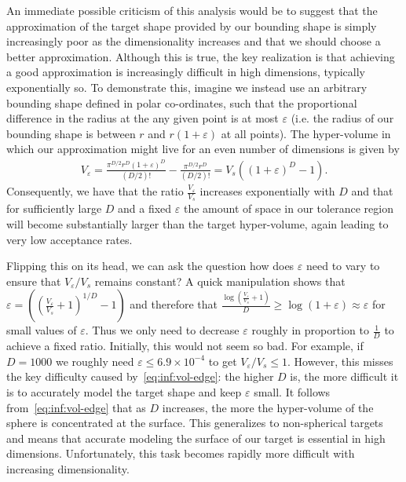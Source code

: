An immediate possible criticism of this analysis would be to suggest that the approximation of the
target shape provided by our bounding shape is simply increasingly poor as the dimensionality 
increases and that we should choose 
a better approximation.  Although this is true, the key realization is that achieving a good approximation
is increasingly difficult in high dimensions, typically exponentially so.
To demonstrate this, imagine we instead use an arbitrary bounding shape defined in polar
co-ordinates, such that the proportional difference in the radius at the any given point is at most $\varepsilon$
(i.e. the radius of our bounding shape is between $r$ and $r(1+\varepsilon)$ at all points).
The hyper-volume in which our approximation might live for an even number of dimensions
is given by
\begin{align}
\label{eq:inf:vol-edge}
V_{\varepsilon} = \frac{\pi^{D/2}r^D(1+\varepsilon)^D}{(D/2)!}-\frac{\pi^{D/2}r^D}{(D/2)!}
= V_s \left(\left(1+\varepsilon\right)^D-1\right).
\end{align}
Consequently, we have that the ratio $\frac{V_{\varepsilon}}{V_s}$ increases exponentially with $D$
and that for sufficiently large $D$ and a fixed $\varepsilon$ the amount of space in our tolerance
region will become substantially larger than the target hyper-volume, again leading to very low acceptance
rates.

Flipping this on its head, we can ask the question how does $\varepsilon$ need to vary
to ensure that $V_{\varepsilon}/V_s$ remains constant?  A quick manipulation shows
that $\varepsilon = \left(\left(\frac{V_{\varepsilon}}{V_s}+1\right)^{1/D}-1\right)$ and therefore that
$\frac{\log \left(\frac{V_{\varepsilon}}{V_s}+1\right)}{D} \ge \log(1+\varepsilon) \approx \varepsilon$
for small values of $\varepsilon$.  Thus we only need to decrease $\varepsilon$ roughly
in proportion to $\frac{1}{D}$ to achieve a fixed ratio.  Initially, this would not seem
so bad.  For example, if $D=1000$ we
roughly need $\varepsilon \le 6.9 \times 10^{-4}$ to get $V_{\varepsilon}/V_s \le 1$.
However, this misses the
key difficulty caused by~\eqref{eq:inf:vol-edge}: the higher $D$ is, the more difficult it is
to accurately model the target shape and keep $\varepsilon$ small.  
It follows from~\eqref{eq:inf:vol-edge} that as $D$ increases, the more the hyper-volume
of the sphere is concentrated at the surface.  This generalizes to non-spherical targets and
means that accurate modeling the surface of our target is essential in high dimensions.
Unfortunately, this task becomes rapidly more difficult with increasing dimensionality.  


